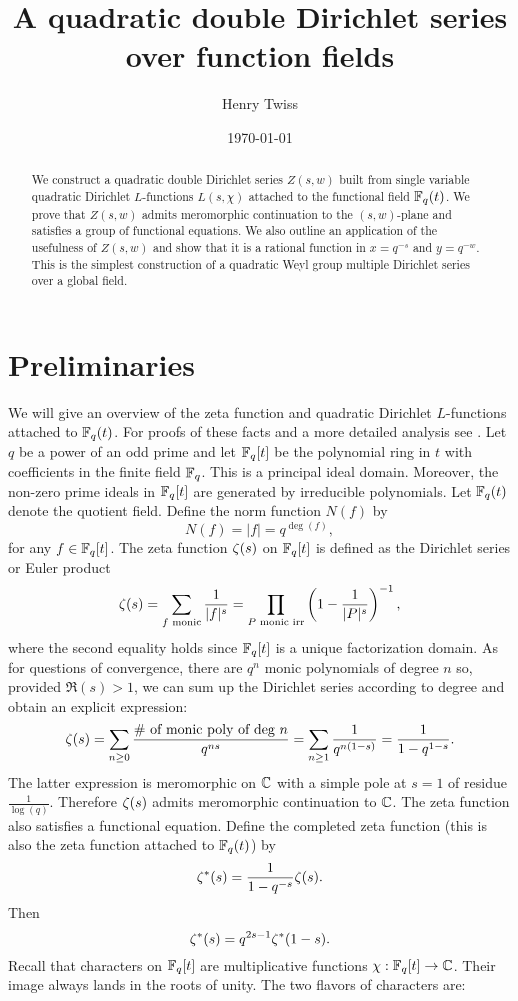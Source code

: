 \documentclass[12pt,reqno,oneside]{amsart}
\title{A quadratic double Dirichlet series over function fields}
\author{Henry Twiss}
\date{\today}
\begin{document}
\begin{abstract}
    We construct a quadratic double Dirichlet series $Z(s,w)$ built from single variable quadratic Dirichlet $L$-functions $L(s,\chi)$ attached to the functional field $\mathbb{F}_{q}(t)$. We prove that $Z(s,w)$ admits meromorphic continuation to the $(s,w)$-plane and satisfies a group of functional equations. We also outline an application of the usefulness of $Z(s,w)$ and show that it is a rational function in $x = q^{-s}$ and $y = q^{-w}$. This is the simplest construction of a quadratic Weyl group multiple Dirichlet series over a global field.
\end{abstract}

\maketitle

\section{Preliminaries}
    We will give an overview of the zeta function and quadratic Dirichlet $L$-functions attached to $\mathbb{F}_{q}(t)$. For proofs of these facts and a more detailed analysis see \cite{R}. Let $q$ be a power of an odd prime and let $\mathbb{F}_{q}[t]$ be the polynomial ring in $t$ with coefficients in the finite field $\mathbb{F}_{q}$. This is a principal ideal domain. Moreover, the non-zero prime ideals in $\mathbb{F}_{q}[t]$ are generated by irreducible polynomials. Let $\mathbb{F}_{q}(t)$ denote the quotient field. Define the norm function $N(f)$ by
    \[
        N(f) = |f| = q^{\deg(f)},
    \]
    for any $f \in \mathbb{F}_{q}[t]$. The zeta function $\zeta(s)$ on $\mathbb{F}_{q}[t]$ is defined as the Dirichlet series or Euler product
    \[
        \zeta(s) = \sum_{\text{$f$ monic}}\frac{1}{|f|^{s}} = \prod_{\text{$P$ monic irr}}\left(1-\frac{1}{|P|^{s}}\right)^{-1},
    \]
    where the second equality holds since $\mathbb{F}_{q}[t]$ is a unique factorization domain. As for questions of convergence, there are $q^{n}$ monic polynomials of degree $n$ so, provided $\Re(s) > 1$, we can sum up the Dirichlet series according to degree and obtain an explicit expression:
    \[
        \zeta(s) = \sum_{n \ge 0}\frac{\text{\# of monic poly of deg $n$}}{q^{ns}} = \sum_{n \ge 1}\frac{1}{q^{n(1-s)}} = \frac{1}{1-q^{1-s}}.
    \]
    The latter expression is meromorphic on $\mathbb{C}$ with a simple pole at $s = 1$ of residue $\frac{1}{\log(q)}$. Therefore $\zeta(s)$ admits meromorphic continuation to $\mathbb{C}$. The zeta function also satisfies a functional equation. Define the completed zeta function (this is also the zeta function attached to $\mathbb{F}_{q}(t)$) by
    \[
        \zeta^{\ast}(s) = \frac{1}{1-q^{-s}}\zeta(s).
    \]
    Then
    \[
        \zeta^{\ast}(s) = q^{2s-1}\zeta^{\ast}(1-s).
    \]
    Recall that characters on $\mathbb{F}_{q}[t]$ are multiplicative functions $\chi:\mathbb{F}_{q}[t] \to \mathbb{C}$. Their image always lands in the roots of unity. The two flavors of characters are:
    
\end{document}
